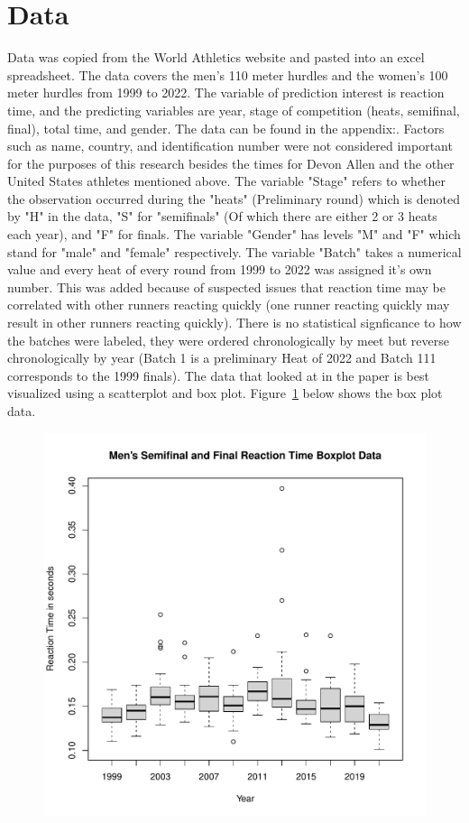 \documentclass[12pt, letterpaper, titlepage]{article}
\begin{document}
\section{Data}
\label{sec:Data}
Data was copied from the World Athletics website and pasted into an excel
spreadsheet. The data covers the men's 110 meter hurdles and the women's 100
meter hurdles from 1999 to 2022.  The variable of prediction interest is reaction
time, and the predicting variables are year, stage of competition (heats, 
semifinal, final), total time, and gender.  The data can be found in the appendix:.  
Factors such as name, country, and identification number were
not considered important for the purposes of this research besides the times for
Devon Allen and the other United States athletes mentioned above.  The variable "Stage"
refers to whether the observation occurred during the "heats" (Preliminary round) which
is denoted by "H" in the data, "S" for "semifinals" (Of which there are either 2 or 3 
heats each year), and "F" for finals. The variable "Gender" has levels "M" and "F" 
which stand for "male" and "female" respectively.  The variable "Batch" takes a 
numerical value and every heat of every round from 1999 to 2022 was assigned it's
own number.  This was added because of suspected issues that reaction time may be
correlated with other runners reacting quickly (one runner reacting quickly may
result in other runners reacting quickly).  There is no statistical signficance to
how the batches were labeled, they were ordered chronologically by meet but
reverse chronologically by year (Batch 1 is a preliminary Heat of 2022 and Batch
111 corresponds to the 1999 finals). The data that looked at in the paper
is best visualized using a scatterplot and box plot. Figure~\ref{fig:DataBoxPlot}
below shows the box plot data.
\begin{figure}[h]
  \centering 
  \includegraphics[scale = 0.5]{DataBoxPlot}
  \label{fig:DataBoxPlot}
\end{figure}
\end{document}
